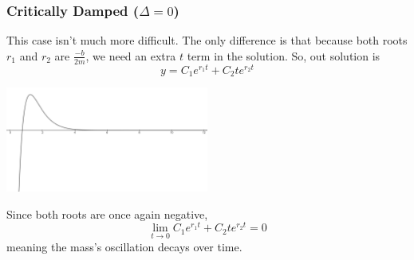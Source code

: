 \subsubsection{Critically Damped ($\Delta = 0$)}
This case isn't much more difficult. The only difference is that because both roots $r_1$ and $r_2$ are $\frac{-b}{2m}$, we need an extra $t$ term in the solution. So, out solution is
\begin{equation*}
	y = C_1e^{r_1 t} + C_2te^{r_2 t}
\end{equation*}
\begin{center}
	\includegraphics[width=0.5\textwidth]{./higherOrder/freeVibrs/criticallydamped.png}
\end{center}
Since both roots are once again negative,
\begin{equation*}
\lim\limits_{t \to 0}{C_1e^{r_1 t} + C_2te^{r_2 t}} = 0
\end{equation*}
meaning the mass's oscillation decays over time.
